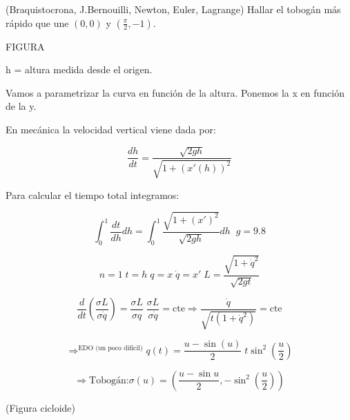\begin{example}
(Braquistocrona, J.Bernouilli, Newton, Euler, Lagrange) Hallar el tobogán más rápido que une $(0,0)$ y $(\frac{\pi}{2},-1)$.

FIGURA

h = altura medida desde el origen.

Vamos a parametrizar la curva en función de la altura. Ponemos la x en función de la y.


En mecánica la velocidad vertical viene dada por:

$$\frac{dh}{dt} = \frac{\sqrt{2gh}}{\sqrt{1+(x'(h))^2}}$$

Para calcular el tiempo total integramos:

$$\int_0^1 \frac{dt}{dh} dh = \int_0^1 \frac{\sqrt{1 + (x')^2}}{\sqrt{2gh}} dh \;\; g = 9.8$$

$$ n=1 \; t=h \; q=x \;  \dot{q}=x' \; L = \frac{\sqrt{1+\dot{q}^2}}{\sqrt{2gt}} $$


$$\frac{d}{dt} (\frac{\sigma L}{\sigma \dot{q}}) = \frac{\sigma L}{\sigma q} \; \frac{\sigma L}{\sigma \dot{q}} = \text{cte} \Rightarrow \frac{\dot{q}}{\sqrt{t(1+\dot{q}^2)}} = \text{cte}$$

$$ \Rightarrow^{\text{EDO (un poco dificil)}} q(t) = \frac{u - \sin(u)}{2} \; t \sin^2(\frac{u}{2}) $$

$$ \Rightarrow \text{Tobogán:} \sigma (u) = ( \frac{u - \sin{u}}{2}, -\sin^2(\frac{u}{2}) ) $$

(Figura cicloide)




\end{example}



